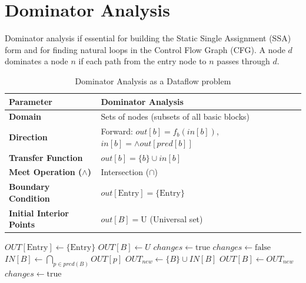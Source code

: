 \section{Dominator Analysis}
Dominator analysis if essential for building the Static Single Assignment (SSA) form and for finding natural loops in the Control Flow Graph (CFG). A node $d$ dominates a node $n$ if each path from the entry node to $n$ passes through $d$.
\begin{table}[H]
\centering
\renewcommand{\arraystretch}{1.5}
\begin{tabular}{ll}
\toprule
\textbf{Parameter} & \textbf{Dominator Analysis} \\
\midrule
\textbf{Domain}                    & Sets of nodes (subsets of all basic blocks) \\
\textbf{Direction}                 & Forward: $out[b] = f_b(in[b])$,\quad $in[b] = \wedge out[pred[b]]$ \\
\textbf{Transfer Function}         & $out[b] = \{b\}\cup in[b]$ \\
\textbf{Meet Operation ($\wedge$)} & Intersection ($\cap$) \\
\textbf{Boundary Condition}        & $out[\text{Entry}] = \{\text{Entry}\}$ \\
\textbf{Initial Interior Points}   & $out[B] = \text{U}$ (Universal set) \\
\bottomrule
\end{tabular}
\caption{Dominator Analysis as a Dataflow problem }
\end{table}

\begin{algorithm}[H]
\caption{Dominator Analysis Algorithm}
\begin{algorithmic}[1]
\State $OUT[\text{Entry}] \gets \{\text{Entry}\}$
    \State $OUT[B] \gets U$
\EndFor
\Statex
\State $changes \gets \text{true}$
    \State $changes \gets \text{false}$
        \State $IN[B] \gets \bigcap_{p \in pred(B)} OUT[p]$
        \State $OUT_{new} \gets \{B\} \cup IN[B]$
            \State $OUT[B] \gets OUT_{new}$
            \State $changes \gets \text{true}$
        \EndIf
    \EndFor
\EndWhile
\end{algorithmic}
\end{algorithm}

